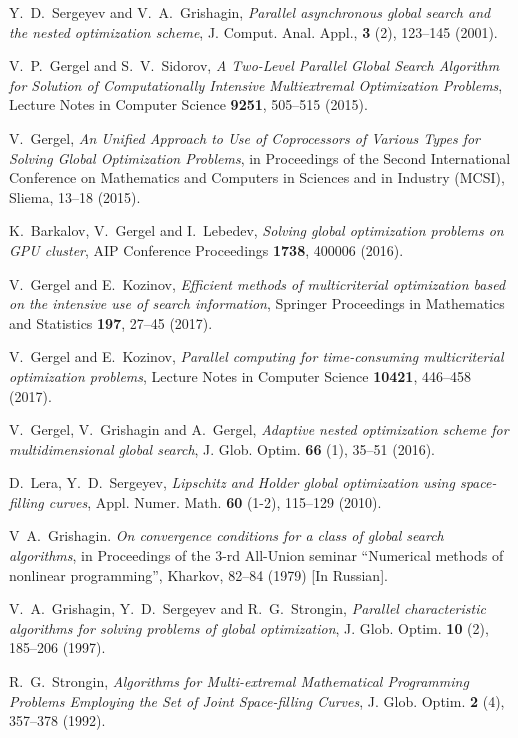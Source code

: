 \documentclass[
11pt,%
tightenlines,%
twoside,%
onecolumn,%
nofloats,%
nobibnotes,%
nofootinbib,%
superscriptaddress,%
noshowpacs,%
centertags]%
{revtex4}
\begin{document}
\begin{thebibliography}{20}
Y.~D.~Sergeyev and V.~A.~Grishagin, \textit{Parallel asynchronous global search and the nested optimization scheme}, J. Comput. Anal. Appl., \textbf{3} (2), 123--145 (2001).

V.~P.~Gergel and S.~V.~Sidorov, \textit{A Two-Level Parallel Global Search Algorithm for Solution of Computationally Intensive Multiextremal Optimization Problems}, Lecture Notes in Computer Science \textbf{9251}, 505--515 (2015).

V.~Gergel, \textit{An Unified Approach to Use of Coprocessors of Various Types for Solving Global Optimization Problems}, in Proceedings of the Second International Conference on Mathematics and Computers in Sciences and in Industry (MCSI), Sliema, 13--18 (2015).

K.~Barkalov, V.~Gergel and I.~Lebedev, \textit{Solving global optimization problems on GPU cluster}, AIP Conference Proceedings \textbf{1738}, 400006 (2016).

V.~Gergel and E.~Kozinov, \textit{Efficient methods of multicriterial optimization based on the intensive use of search information}, Springer Proceedings in Mathematics and Statistics \textbf{197}, 27--45 (2017). 

V.~Gergel and E.~Kozinov, \textit{Parallel computing for time-consuming multicriterial optimization problems}, Lecture Notes in Computer Science \textbf{10421}, 446--458 (2017).

V.~Gergel, V.~Grishagin and A.~Gergel, \textit{Adaptive nested optimization scheme for multidimensional global search}, J. Glob. Optim.  \textbf{66} (1), 35--51 (2016).

D.~Lera, Y.~D.~Sergeyev, \textit{Lipschitz and Holder global optimization using space-filling curves},  Appl. Numer. Math. \textbf{60} (1-2), 115--129 (2010).

V~A.~Grishagin. \textit{On convergence conditions for a class of global search algorithms}, in Proceedings of the 3-rd All-Union seminar ``Numerical methods of nonlinear programming'', Kharkov, 82--84 (1979) [In Russian].

V.~A.~Grishagin, Y.~D.~Sergeyev and R.~G.~Strongin, \textit{Parallel characteristic algorithms for solving problems of global optimization}, J. Glob. Optim. \textbf{10} (2), 185--206 (1997).

R.~G.~Strongin, \textit{Algorithms for Multi-extremal Mathematical Programming Problems Employing the Set of Joint Space-filling Curves}, J. Glob. Optim. \textbf{2} (4), 357--378 (1992).


\end{thebibliography}
\end{document}
